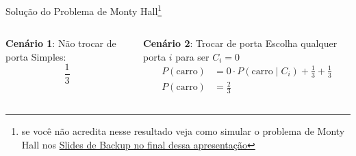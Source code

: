 \begin{frame}[t]{Solução do Problema de Monty Hall\footnote{se você não acredita nesse resultado veja como simular o problema de Monty Hall nos \hyperlink{appendixmontyhall}{Slides de Backup no final dessa apresentação}}}
    \begin{columns}[t]
        \begin{column}{0.5\textwidth}
            {\Large \textbf{Cenário 1}: Não trocar de porta} \newline \newline
            Simples: $$\frac{1}{3}$$
        \end{column}
        \begin{column}{0.5\textwidth}
            {\Large \textbf{Cenário 2}: Trocar de porta} \newline \newline
            Escolha qualquer porta $i$ para ser $C_i = 0$
            \vfill
            $$
            \begin{aligned}
                P(\text{carro}) &= 0 \cdot P(\text{carro} \mid C_i) + \frac{1}{3} + \frac{1}{3} \\
                P(\text{carro}) &= \frac{2}{3}
            \end{aligned}
            $$
        \end{column}
    \end{columns}
\end{frame}

